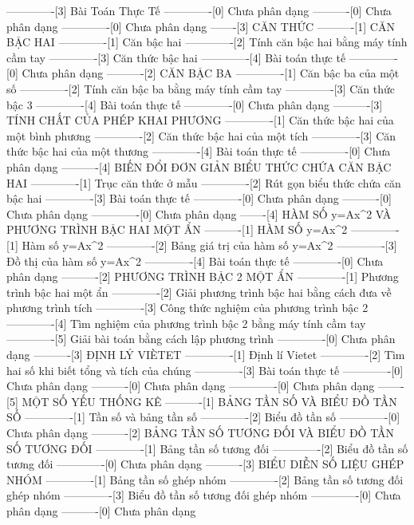 -------------[3] Bài Toán Thực Tế
-------------[0] Chưa phân dạng
----------[0] Chưa phân dạng
-------------[0] Chưa phân dạng
-------[3] CĂN THỨC
----------[1] CĂN BẬC HAI
-------------[1] Căn bậc hai
-------------[2] Tính căn bậc hai bằng máy tính cầm tay
-------------[3] Căn thức bậc hai
-------------[4] Bài toán thực tế
-------------[0] Chưa phân dạng
----------[2] CĂN BẬC BA
-------------[1] Căn bậc ba của một số
-------------[2] Tính căn bậc ba bằng máy tính cầm tay
-------------[3] Căn thức bậc 3
-------------[4] Bài toán thực tế
-------------[0] Chưa phân dạng
----------[3] TÍNH CHẤT CỦA PHÉP KHAI PHƯƠNG
-------------[1] Căn thức bậc hai của một bình phương
-------------[2] Căn thức bậc hai của một tích
-------------[3] Căn thức bậc hai của một thương
-------------[4] Bài toán thực tế
-------------[0] Chưa phân dạng
----------[4] BIẾN ĐỔI ĐƠN GIẢN BIỂU THỨC CHỨA CĂN BẬC HAI
-------------[1] Trục căn thức ở mẫu
-------------[2] Rút gọn biểu thức chứa căn bậc hai
-------------[3] Bài toán thực tế
-------------[0] Chưa phân dạng
----------[0] Chưa phân dạng
-------------[0] Chưa phân dạng
-------[4] HÀM SỐ y=Ax^2 VÀ PHƯƠNG TRÌNH BẬC HAI MỘT ẨN
----------[1] HÀM SỐ y=Ax^2
-------------[1] Hàm số y=Ax^2
-------------[2] Bảng giá trị của hàm số y=Ax^2
-------------[3] Đồ thị của hàm số y=Ax^2
-------------[4] Bài toán thực tế
-------------[0] Chưa phân dạng
----------[2] PHƯƠNG TRÌNH BẬC 2 MỘT ẨN
-------------[1] Phương trình bậc hai một ẩn
-------------[2] Giải phương trình bậc hai bằng cách đưa về phương trình tích
-------------[3] Công thức nghiệm của phương trình bậc 2
-------------[4] Tìm nghiệm của phương trình bậc 2 bằng máy tính cầm tay
-------------[5] Giải bài toán bằng cách lập phương trình
-------------[0] Chưa phân dạng
----------[3] ĐỊNH LÝ VIÈTET
-------------[1] Định lí Vietet
-------------[2] Tìm hai số khi biết tổng và tích của chúng
-------------[3] Bài toán thực tế
-------------[0] Chưa phân dạng
----------[0] Chưa phân dạng
-------------[0] Chưa phân dạng
-------[5] MỘT SỐ YẾU THỐNG KÊ
----------[1] BẢNG TẦN SỐ VÀ BIỂU ĐỒ TẦN SỐ
-------------[1] Tần số và bảng tần số
-------------[2] Biểu đồ tần số
-------------[0] Chưa phân dạng
----------[2] BẢNG TẦN SỐ TƯƠNG ĐỐI VÀ BIỂU ĐỒ TẦN SỐ TƯƠNG ĐỐI
-------------[1] Bảng tần số tương đối
-------------[2] Biểu đồ tần số tương đối
-------------[0] Chưa phân dạng
----------[3] BIỂU DIỄN SỐ LIỆU GHÉP NHÓM
-------------[1] Bảng tần số ghép nhóm
-------------[2] Bảng tần số tương đối ghép nhóm
-------------[3] Biểu đồ tần số tương đối ghép nhóm
-------------[0] Chưa phân dạng
----------[0] Chưa phân dạng
